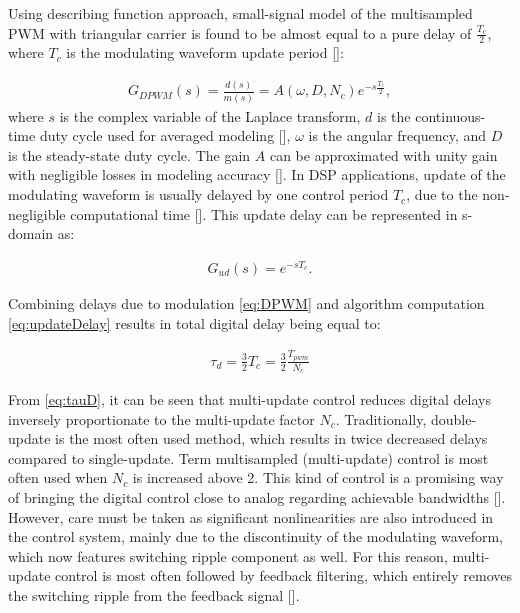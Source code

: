 \documentclass[journal]{IEEEtran}
\begin{document}
Using describing function approach, small-signal model of the multisampled PWM with triangular carrier is found to be almost equal to a pure delay of $\frac{T_c}{2}$, where $T_c$ is the modulating waveform update period []:

\begin{equation}
\begin{aligned}
G_{DPWM} (s) = \frac{d(s)}{m(s)} = A(\omega,D,N_c) e^{-s\frac{T_c}{2}},
\label{eq:DPWM} 
\end{aligned}    
\end{equation}
where $s$ is the complex variable of the Laplace transform, $d$ is the continuous-time duty cycle used for averaged modeling [], $\omega$ is the angular frequency, and $D$ is the steady-state duty cycle. The gain $A$ can be approximated with unity gain with negligible losses in modeling accuracy [].
In DSP applications, update of the modulating waveform is usually delayed by one control period $T_c$, due to the non-negligible computational time []. This update delay can be represented in s-domain as:

\begin{equation}
\begin{aligned}
G_{ud} (s) = e^{-sT_c}.
\label{eq:updateDelay} 
\end{aligned} 
\end{equation}

Combining delays due to modulation \eqref{eq:DPWM} and algorithm computation \eqref{eq:updateDelay} results in total digital delay being equal to:

\begin{equation}
\begin{aligned}
\tau_{d} = \frac{3}{2}T_c = \frac{3}{2} \frac{T_{pwm}}{N_c}
\label{eq:tauD} 
\end{aligned}    
\end{equation}

From \eqref{eq:tauD}, it can be seen that multi-update control reduces digital delays inversely proportionate to the multi-update factor $N_c$. Traditionally, double-update is the most often used method, which results in twice decreased delays compared to single-update.
Term multisampled (multi-update) control is most often used when $N_c$ is increased above 2. This kind of control is a promising way of bringing the digital control close to analog regarding achievable bandwidths []. However, care must be taken as significant nonlinearities are also introduced in the control system, mainly due to the discontinuity of the modulating waveform, which now features switching ripple component as well. For this reason, multi-update control is most often followed by feedback filtering, which entirely removes the switching ripple from the feedback signal []. 
\end{document}
